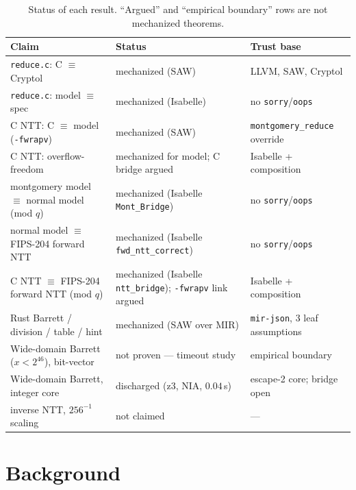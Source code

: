 \documentclass[11pt]{article}
\newcommand{\code}[1]{\texttt{#1}}
\begin{document}
\begin{table}[h]
\centering\footnotesize
\begin{tabular}{@{}p{5.0cm}p{5.0cm}p{4.3cm}@{}}
\hline
Claim & Status & Trust base \\
\hline
\code{reduce.c}: C $\equiv$ Cryptol & mechanized (SAW) & LLVM, SAW, Cryptol \\
\code{reduce.c}: model $\equiv$ spec & mechanized (Isabelle) & no \code{sorry}/\code{oops} \\
C NTT: C $\equiv$ model (\code{-fwrapv}) & mechanized (SAW) & \code{montgomery\_reduce} override \\
C NTT: overflow-freedom & mechanized for model; C bridge argued & Isabelle + composition \\
montgomery model $\equiv$ normal model (mod $q$) & mechanized (Isabelle \code{Mont\_Bridge}) & no \code{sorry}/\code{oops} \\
normal model $\equiv$ FIPS-204 forward NTT & mechanized (Isabelle \code{fwd\_ntt\_correct}) & no \code{sorry}/\code{oops} \\
C NTT $\equiv$ FIPS-204 forward NTT (mod $q$) & mechanized (Isabelle \code{ntt\_bridge}); \code{-fwrapv} link argued & Isabelle + composition \\
Rust Barrett / division / table / hint & mechanized (SAW over MIR) & \code{mir-json}, 3 leaf assumptions \\
Wide-domain Barrett ($x<2^{46}$), bit-vector & not proven --- timeout study & empirical boundary \\
Wide-domain Barrett, integer core & discharged (z3, NIA, $0.04$\,s) & escape-2 core; bridge open \\
inverse NTT, $256^{-1}$ scaling & not claimed & --- \\
\hline
\end{tabular}
\caption{Status of each result. ``Argued'' and ``empirical boundary'' rows are not mechanized theorems.}
\label{tab:status}
\end{table}

\section{Background}\label{sec:background}
\end{document}
